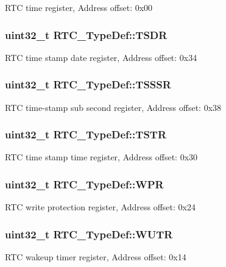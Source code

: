 R\-T\-C time register, Address offset\-: 0x00 \hypertarget{struct_r_t_c___type_def_aa4633dbcdb5dd41a714020903fd67c82}{
\subsubsection[{T\-S\-D\-R}]{ uint32\-\_\-t R\-T\-C\-\_\-\-Type\-Def\-::\-T\-S\-D\-R}}\label{struct_r_t_c___type_def_aa4633dbcdb5dd41a714020903fd67c82}
R\-T\-C time stamp date register, Address offset\-: 0x34 \hypertarget{struct_r_t_c___type_def_a1e8b4b987496ee1c0c6f16b0a94ea1a1}{
\subsubsection[{T\-S\-S\-S\-R}]{ uint32\-\_\-t R\-T\-C\-\_\-\-Type\-Def\-::\-T\-S\-S\-S\-R}}\label{struct_r_t_c___type_def_a1e8b4b987496ee1c0c6f16b0a94ea1a1}
R\-T\-C time-\/stamp sub second register, Address offset\-: 0x38 \hypertarget{struct_r_t_c___type_def_a1ddbb2a5eaa54ff43835026dec99ae1c}{
\subsubsection[{T\-S\-T\-R}]{ uint32\-\_\-t R\-T\-C\-\_\-\-Type\-Def\-::\-T\-S\-T\-R}}\label{struct_r_t_c___type_def_a1ddbb2a5eaa54ff43835026dec99ae1c}
R\-T\-C time stamp time register, Address offset\-: 0x30 \hypertarget{struct_r_t_c___type_def_ad54765af56784498a3ae08686b79a1ff}{
\subsubsection[{W\-P\-R}]{ uint32\-\_\-t R\-T\-C\-\_\-\-Type\-Def\-::\-W\-P\-R}}\label{struct_r_t_c___type_def_ad54765af56784498a3ae08686b79a1ff}
R\-T\-C write protection register, Address offset\-: 0x24 \hypertarget{struct_r_t_c___type_def_ad93017bb0a778a2aad9cd71211fc770a}{
\subsubsection[{W\-U\-T\-R}]{ uint32\-\_\-t R\-T\-C\-\_\-\-Type\-Def\-::\-W\-U\-T\-R}}\label{struct_r_t_c___type_def_ad93017bb0a778a2aad9cd71211fc770a}
R\-T\-C wakeup timer register, Address offset\-: 0x14 

